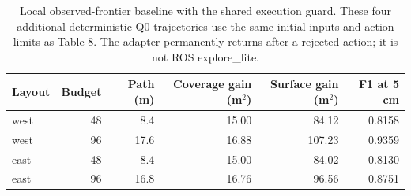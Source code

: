 \begin{table}[!htbp]
\centering
\caption{Local observed-frontier baseline with the shared execution guard. These four additional deterministic Q0 trajectories use the same initial inputs and action limits as Table 8. The adapter permanently returns after a rejected action; it is not ROS explore\_lite.}\label{tab:9}
\small\setlength{\tabcolsep}{5pt}
\begin{tabular}{@{}lrrrrr@{}}
\toprule
Layout & Budget & Path (m) & Coverage gain (m$^2$) & Surface gain (m$^2$) & F1 at 5 cm\\
\midrule
west & 48 & 8.4 & 15.00 & 84.12 & 0.8158 \\
west & 96 & 17.6 & 16.88 & 107.23 & 0.9359 \\
east & 48 & 8.4 & 15.00 & 84.02 & 0.8130 \\
east & 96 & 16.8 & 16.76 & 96.56 & 0.8751 \\
\bottomrule
\end{tabular}
\end{table}
